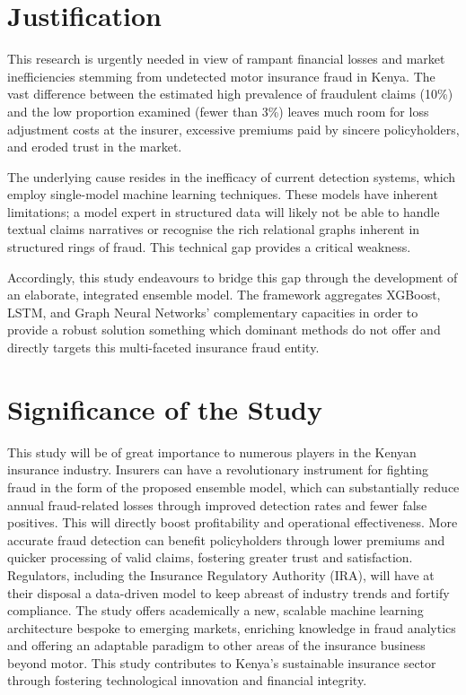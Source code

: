 \documentclass[12pt,a4paper,oneside]{report}
\numberwithin{equation}{chapter}
\begin{document}
\section{Justification}

This research is urgently needed in view of rampant financial losses and market inefficiencies
stemming from undetected motor insurance fraud in Kenya. The vast difference between the estimated
high prevalence of fraudulent claims (10\%) \cite{itri2019performance} and the low proportion
examined (fewer than 3\%) \cite{kowshalya2018predicting} leaves much room for loss adjustment
costs at the insurer, excessive premiums paid by sincere policyholders, and eroded trust in
the market.

The underlying cause resides in the inefficacy of current detection systems, which employ
single-model machine learning techniques. These models have inherent limitations; a model expert
in structured data will likely not be able to handle textual claims narratives or recognise the
rich relational graphs inherent in structured rings of fraud. This technical gap provides a
critical weakness.

Accordingly, this study endeavours to bridge this gap through the development of an elaborate,
integrated ensemble model. The framework aggregates XGBoost, LSTM, and Graph Neural Networks'
complementary capacities in order to provide a robust solution something which dominant methods
do not offer and directly targets this multi-faceted insurance fraud entity.
\newpage

\section{Significance of the Study}

This study will be of great importance to numerous players in the Kenyan insurance industry.
Insurers can have a revolutionary instrument for fighting fraud in the form of the proposed
ensemble model, which can substantially reduce annual fraud-related losses through improved
detection rates and fewer false positives. This will directly boost profitability and operational
effectiveness. More accurate fraud detection can benefit policyholders through lower premiums and
quicker processing of valid claims, fostering greater trust and satisfaction. Regulators, including
the Insurance Regulatory Authority (IRA), will have at their disposal a data-driven model to keep
abreast of industry trends and fortify compliance. The study offers academically a new, scalable
machine learning architecture bespoke to emerging markets, enriching knowledge in fraud analytics
and offering an adaptable paradigm to other areas of the insurance business beyond motor. This
study contributes to Kenya's sustainable insurance sector through fostering technological innovation
and financial integrity.
\end{document}
